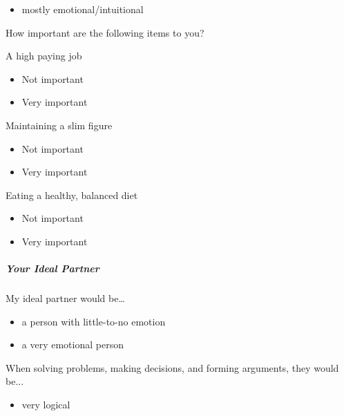 \documentclass[twoside]{report}
\begin{document}
\begin{multicols}{2}
\begin{itemize}
\item
  mostly emotional/intuitional
\end{itemize}

How important are the following items to you?

A high paying job

\begin{itemize}
\item
  Not important
\end{itemize}

\begin{itemize}
\item
  Very important
\end{itemize}

Maintaining a slim figure

\begin{itemize}
\item
  Not important
\end{itemize}

\begin{itemize}
\item
  Very important
\end{itemize}

Eating a healthy, balanced diet

\begin{itemize}
\item
  Not important
\end{itemize}

\begin{itemize}
\item
  Very important
\end{itemize}

\subparagraph{Your Ideal Partner}

My ideal partner would be\ldots{}

\begin{itemize}
\item
  a person with little-to-no emotion
\end{itemize}

\begin{itemize}
\item
  a very emotional person
\end{itemize}

When solving problems, making decisions, and forming arguments, they
would be...

\begin{itemize}
\item
  very logical
\end{itemize}


\end{multicols}
\end{document}
